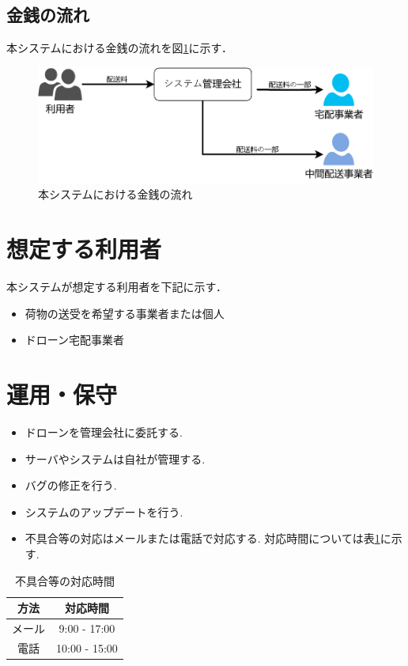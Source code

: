 \documentclass[a4paper, titlepage]{jsarticle}
\begin{document}
\subsection{金銭の流れ}
本システムにおける金銭の流れを図\ref{fig:money_flow_1}に示す．

\begin{figure}[H]
  \centering
  \includegraphics[width=0.6\linewidth]{./money_flow.pdf}
  \caption{本システムにおける金銭の流れ}
  \label{fig:money_flow_1}
\end{figure}


\section{想定する利用者}
本システムが想定する利用者を下記に示す．
\begin{itemize}
        \item 荷物の送受を希望する事業者または個人
        \item ドローン宅配事業者
\end{itemize}

\section{運用・保守}
\begin{itemize}
\item ドローンを管理会社に委託する.
\item サーバやシステムは自社が管理する.
\item バグの修正を行う.
\item システムのアップデートを行う.
\item 不具合等の対応はメールまたは電話で対応する. 対応時間については表\ref{tb:huguai}に示す.
\end{itemize}

\begin{table}[htbp]
  \centering
  \begin{tabular}{c|c} \hline
    方法 & 対応時間 \\ \hline
    メール & 9:00 - 17:00 \\
    電話 & 10:00 - 15:00 \\ \hline
  \end{tabular}
  \caption{不具合等の対応時間}
  \label{tb:huguai}
\end{table}
\end{document}
